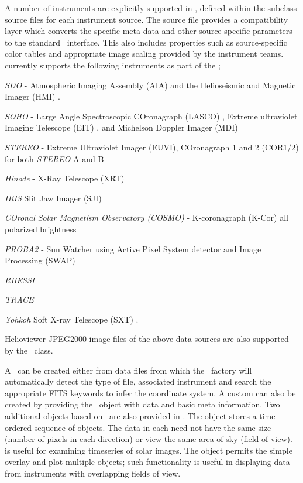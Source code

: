 A number of instruments are explicitly supported in \sunpypkg, defined within the subclass source files for each instrument source.
The source file provides a compatibility layer which converts the specific meta data and other source-specific parameters to the standard \GenericMap\ interface.
This also includes properties such as source-specific color tables and appropriate image scaling provided by the instrument teams.
\sunpypkg currently supports the following instruments as part of the \GenericMap;
\begin{inparaitem}
\item \textit{SDO} - Atmospheric Imaging Assembly (AIA) \citep{lemen2011atmospheric} and the Helioseismic and Magnetic Imager (HMI) \citep{scherrer2012helioseismic}.
\item \textit{SOHO} - Large Angle Spectroscopic COronagraph (LASCO) \citep{brueckner1995large}, Extreme ultraviolet Imaging Telescope (EIT) \citep{delaboudiniere1995eit}, and Michelson Doppler Imager (MDI) \citep{scherrer1995solar}
\item \textit{STEREO} - Extreme Ultraviolet Imager (EUVI), COronagraph 1 and 2 (COR1/2) for both \textit{STEREO} A and B \citep{howard2008sun}
\item \textit{Hinode} - X-Ray Telescope (XRT) \citep{golub2008x}
\item \textit{IRIS} Slit Jaw Imager (SJI) \citep{DePontieu2014}
\item \textit{COronal Solar Magnetism Observatory (COSMO)} -  K-coronagraph (K-Cor) all polarized brightness
\item \textit{PROBA2} - Sun Watcher using Active Pixel System detector and Image Processing (SWAP) \citep{seaton2013swap}
\item \textit{RHESSI} \citep{lin2002reuven}
\item \textit{TRACE}
\item \textit{Yohkoh} Soft X-ray Telescope (SXT) \citep{tsuneta1991soft}.
\end{inparaitem}
Helioviewer JPEG2000 image files of the above data sources are also supported by the \Map\ class.

A \sunpy \Map\ can be created either from data files from which the \Map\ factory will automatically detect the type of file, associated instrument and search the appropriate FITS keywords to infer the coordinate system. A custom \GenericMap can also be created by providing the \Map\ object with data and basic meta information.
Two additional objects based on \Map\ are also provided in \sunpy.
The  object stores a time-ordered sequence of \Map objects.
The data in each \Map need not have the same size (number of pixels in each direction) or view the same area of sky (field-of-view).  is useful for examining timeseries of solar images.
The  object permits the simple overlay and plot multiple \Map objects; such functionality is useful in displaying data from instruments with overlapping fields of view.
